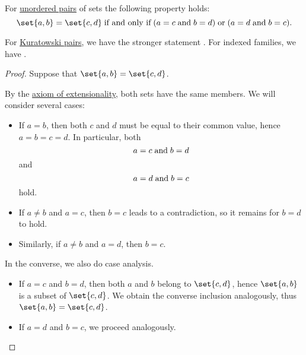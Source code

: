 \begin{proposition}\label{thm:unordered_pair_extensionality}
  For \hyperref[def:unordered_pair]{unordered pairs} of sets the following property holds:
  \begin{equation}\label{eq:thm:unordered_pair_extensionality}
    \set{ a, b } = \set{ c, d } \T{if and only if} (a = c \T{and} b = d) \T{or} (a = d \T{and} b = c).
  \end{equation}
\end{proposition}
\begin{comments}
  \item For \hyperref[def:kuratowski_pair]{Kuratowski pairs}, we have the stronger statement . For indexed families, we have .
\end{comments}
\begin{proof}
  \SufficiencySubProof Suppose that \( \set{ a, b } = \set{ c, d } \).

  By the \hyperref[def:naive_set_theory/extensionality]{axiom of extensionality}, both sets have the same members. We will consider several cases:
  \begin{itemize}
    \item If \( a = b \), then both \( c \) and \( d \) must be equal to their common value, hence \( a = b = c = d \). In particular, both
    \begin{equation*}
      a = c \T{and} b = d
    \end{equation*}
    and
    \begin{equation*}
      a = d \T{and} b = c
    \end{equation*}
    hold.

    \item If \( a \neq b \) and \( a = c \), then \( b = c \) leads to a contradiction, so it remains for \( b = d \) to hold.

    \item Similarly, if \( a \neq b \) and \( a = d \), then \( b = c \).
  \end{itemize}

  \NecessitySubProof In the converse, we also do case analysis.
  \begin{itemize}
    \item If \( a = c \) and \( b = d \), then both \( a \) and \( b \) belong to \( \set{ c, d } \), hence \( \set{ a, b } \) is a subset of \( \set{ c, d } \). We obtain the converse inclusion analogously, thus \( \set{ a, b } = \set{ c, d } \).

    \item If \( a = d \) and \( b = c \), we proceed analogously.
  \end{itemize}
\end{proof}

